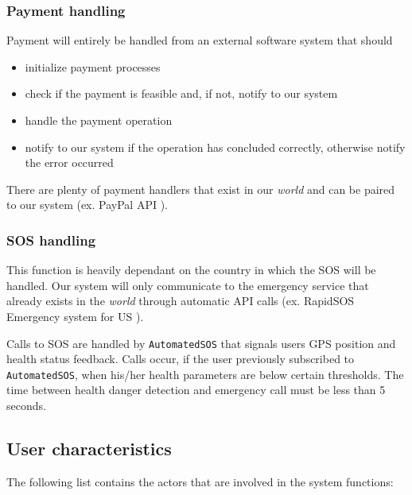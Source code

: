 \documentclass[12pt]{article}
\begin{document}
    \subsubsection{Payment handling}

      Payment will entirely be handled from an external software system that should
      \begin{itemize}
        \item initialize payment processes
        \item check if the payment is feasible and, if not, notify to our system
        \item handle the payment operation
        \item notify to our system if the operation has concluded correctly, otherwise notify the error occurred
      \end{itemize}
      There are plenty of payment handlers that exist in our \textit{world} and can be paired to our system (ex. PayPal API \cite{paypal}).

    \subsubsection{SOS handling}

      This function is heavily dependant on the country in which the SOS will be handled. Our system will only communicate to the emergency service that already exists in the \textit{world} through automatic API calls (ex. RapidSOS Emergency system for US \cite{sos}).

      Calls to SOS are handled by \texttt{AutomatedSOS} that signals users GPS position and health status feedback. Calls occur, if the user previously subscribed to \texttt{AutomatedSOS}, when his/her health parameters are below certain thresholds. The time between health danger detection and emergency call must be less than 5 seconds.

  \subsection{User characteristics}

    The following list contains the actors that are involved in the system functions:
\end{document}
